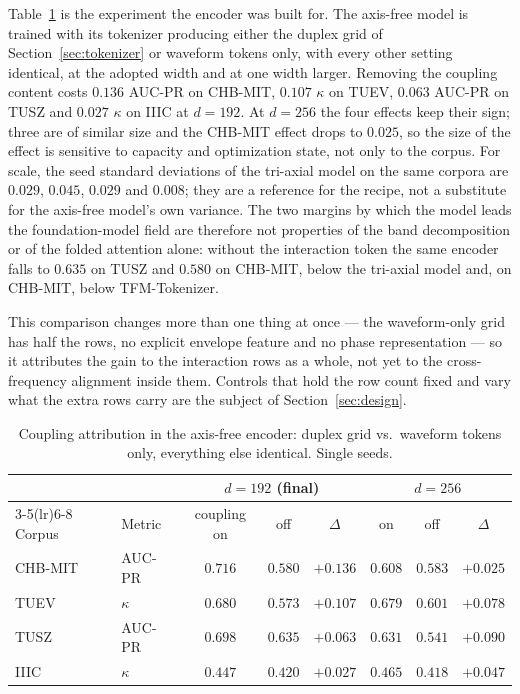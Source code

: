 Table~\ref{tab:attribution} is the experiment the encoder was built for.
The axis-free model is trained with its tokenizer producing either the
duplex grid of Section~\ref{sec:tokenizer} or waveform tokens only, with
every other setting identical, at the adopted width and at one width
larger. Removing the coupling content costs $0.136$ AUC-PR on CHB-MIT,
$0.107$ $\kappa$ on TUEV, $0.063$ AUC-PR on TUSZ and $0.027$ $\kappa$ on
IIIC at $d{=}192$. At $d{=}256$ the four effects keep their sign; three
are of similar size and the CHB-MIT effect drops to $0.025$, so the size
of the effect is sensitive to capacity and optimization state, not only
to the corpus. For scale, the seed standard deviations of the tri-axial
model on the same corpora are $0.029$, $0.045$, $0.029$ and $0.008$; they
are a reference for the recipe, not a substitute for the axis-free
model's own variance. The two margins by which the model leads the
foundation-model field are therefore not properties of the band
decomposition or of the folded attention alone: without the interaction
token the same encoder falls to $0.635$ on TUSZ and $0.580$ on CHB-MIT,
below the tri-axial model and, on CHB-MIT, below TFM-Tokenizer.

This comparison changes more than one thing at once --- the waveform-only
grid has half the rows, no explicit envelope feature and no phase
representation --- so it attributes the gain to the interaction rows as a
whole, not yet to the cross-frequency alignment inside them. Controls
that hold the row count fixed and vary what the extra rows carry are the
subject of Section~\ref{sec:design}.

\begin{table}[t]
\centering
\small
\caption{Coupling attribution in the axis-free encoder: duplex grid vs.\
waveform tokens only, everything else identical. Single seeds.}
\label{tab:attribution}
\begin{tabular}{llcccccc}
\toprule
 & & \multicolumn{3}{c}{$d{=}192$ (final)} & \multicolumn{3}{c}{$d{=}256$} \\
\cmidrule(lr){3-5}\cmidrule(lr){6-8}
Corpus & Metric & coupling on & off & $\Delta$ & on & off & $\Delta$ \\
\midrule
CHB-MIT & AUC-PR & $\mathbf{0.716}$ & $0.580$ & $\mathbf{+0.136}$ & $0.608$ & $0.583$ & $+0.025$ \\
TUEV & $\kappa$ & $\mathbf{0.680}$ & $0.573$ & $\mathbf{+0.107}$ & $0.679$ & $0.601$ & $+0.078$ \\
TUSZ & AUC-PR & $\mathbf{0.698}$ & $0.635$ & $\mathbf{+0.063}$ & $0.631$ & $0.541$ & $+0.090$ \\
IIIC & $\kappa$ & $\mathbf{0.447}$ & $0.420$ & $+0.027$ & $0.465$ & $0.418$ & $+0.047$ \\
\bottomrule
\end{tabular}
\end{table}

